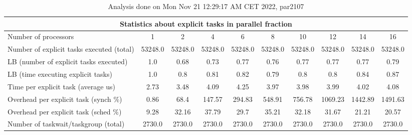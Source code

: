 \begin{table}[h]
\begin{center}
\begin{tabular}{|l|c|c|c|c|c|c|c|c|c|}
\hline
\multicolumn{10}{|c|}{Statistics about explicit tasks in parallel fraction} \\
\hline
\hline
Number of processors & 1 & 2 & 4 & 6 & 8 & 10 & 12 & 14 & 16 \\
\hline
\hline
Number of explicit tasks executed (total)        &         53248.0 &         53248.0 &         53248.0 &         53248.0 &         53248.0 &         53248.0 &         53248.0 &         53248.0 &         53248.0 \\
\hline
LB (number of explicit tasks executed)           &             1.0 &            0.68 &            0.73 &            0.77 &            0.76 &            0.77 &            0.77 &            0.77 &            0.79 \\
\hline
LB (time executing explicit tasks)               &             1.0 &             0.8 &            0.81 &            0.82 &            0.79 &             0.8 &             0.8 &            0.84 &            0.87 \\
\hline
Time per explicit task (average us)                 &            2.73 &            3.48 &            4.09 &            4.25 &            3.97 &            3.98 &            3.99 &            4.02 &            4.08 \\
\hline
Overhead per explicit task (synch \%)             &            0.86 &            68.4 &          147.57 &          294.83 &          548.91 &          756.78 &         1069.23 &         1442.89 &         1491.63 \\
\hline
Overhead per explicit task (sched \%)             &            9.28 &           32.16 &           37.79 &            29.7 &           35.21 &           32.18 &           31.67 &           21.21 &           20.57 \\
\hline
Number of taskwait/taskgroup (total)             &          2730.0 &          2730.0 &          2730.0 &          2730.0 &          2730.0 &          2730.0 &          2730.0 &          2730.0 &          2730.0 \\
\hline
\end{tabular}
\end{center}
\caption{ Analysis done on Mon Nov 21 12:29:17 AM CET 2022, par2107}
\end{table}
